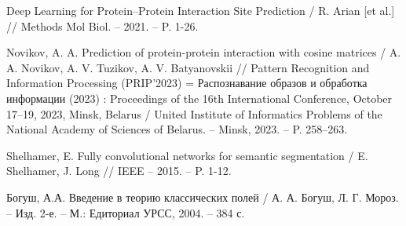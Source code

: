 \newpage
{} %
\renewcommand{\bibsection}{\centering\textbf{\large СПИСОК ИСПОЛЬЗОВАННЫХ ИСТОЧНИКОВ}} %
%

%

\begin{thebibliography}{9}

Deep Learning for Protein–Protein Interaction Site Prediction / R. Arian [et al.] // Methods Mol Biol. – 2021. – P. 1-26.

Novikov, A. A. Prediction of protein-protein interaction with cosine matrices / A. A. Novikov, A. V. Tuzikov, A. V. Batyanovskii // Pattern Recognition and Information Processing (PRIP'2023) = Распознавание образов и обработка информации (2023) : Proceedings of the 16th International Conference, October 17–19, 2023, Minsk, Belarus / United Institute of Informatics Problems of the National Academy of Sciences of Belarus. – Minsk, 2023. – P. 258–263.

Shelhamer, E. Fully convolutional networks for semantic segmentation / E. Shelhamer, J. Long // IEEE – 2015. – P. 1-12.

Богуш, А.А. Введение в теорию классических полей / А. А. Богуш, Л. Г. Мороз. -- Изд. 2-е. -- М.: Едиториал УРСС, 2004. -- 384 с.

\end{thebibliography}